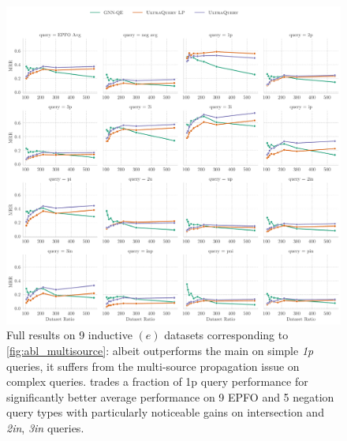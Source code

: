 \begin{figure}[t]
    \centering
    \includegraphics[width=\linewidth]{figs/app_inde_pyg.pdf}
    \caption{Full results on 9 inductive $(e)$ datasets corresponding to \autoref{fig:abl_multisource}: albeit \methodlp outperforms the main \method on simple \emph{1p} queries, it suffers from the multi-source propagation issue on complex queries. \method trades a fraction of 1p query performance for significantly better average performance on 9 EPFO and 5 negation query types with particularly noticeable gains on intersection and \emph{2in}, \emph{3in} queries. }
    \label{fig:app_inde_full}
\end{figure}


